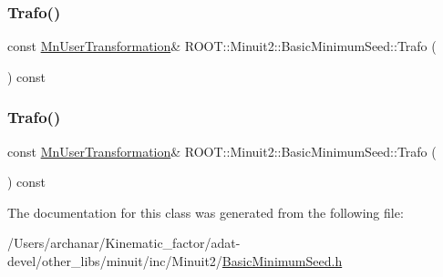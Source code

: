\subsubsection{\texorpdfstring{Trafo()}{Trafo()}\hspace{0.1cm}{\footnotesize\ttfamily [2/3]}}
{\footnotesize\ttfamily const \mbox{\hyperlink{classROOT_1_1Minuit2_1_1MnUserTransformation}{Mn\+User\+Transformation}}\& R\+O\+O\+T\+::\+Minuit2\+::\+Basic\+Minimum\+Seed\+::\+Trafo (\begin{DoxyParamCaption}{ }\end{DoxyParamCaption}) const\hspace{0.3cm}{\ttfamily [inline]}}

\mbox{\label{classROOT_1_1Minuit2_1_1BasicMinimumSeed_aa40157cea0a8a75b56af25bbc64f8d39}} 
\subsubsection{\texorpdfstring{Trafo()}{Trafo()}\hspace{0.1cm}{\footnotesize\ttfamily [3/3]}}
{\footnotesize\ttfamily const \mbox{\hyperlink{classROOT_1_1Minuit2_1_1MnUserTransformation}{Mn\+User\+Transformation}}\& R\+O\+O\+T\+::\+Minuit2\+::\+Basic\+Minimum\+Seed\+::\+Trafo (\begin{DoxyParamCaption}{ }\end{DoxyParamCaption}) const\hspace{0.3cm}{\ttfamily [inline]}}



The documentation for this class was generated from the following file\+:\begin{DoxyCompactItemize}
\item 
/\+Users/archanar/\+Kinematic\+\_\+factor/adat-\/devel/other\+\_\+libs/minuit/inc/\+Minuit2/\mbox{\hyperlink{adat-devel_2other__libs_2minuit_2inc_2Minuit2_2BasicMinimumSeed_8h}{Basic\+Minimum\+Seed.\+h}}\end{DoxyCompactItemize}
